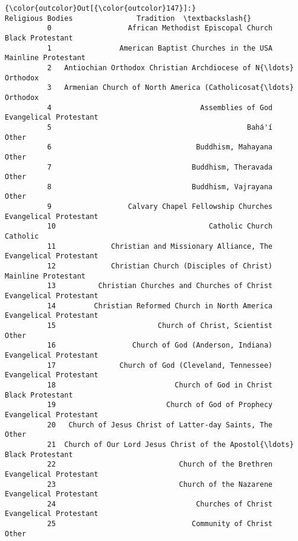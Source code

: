 \documentclass[11pt]{article}
\begin{document}
\begin{Verbatim}[commandchars=\\\{\}]
{\color{outcolor}Out[{\color{outcolor}147}]:}                                      Religious Bodies               Tradition  \textbackslash{}
          0                  African Methodist Episcopal Church        Black Protestant   
          1                American Baptist Churches in the USA     Mainline Protestant   
          2   Antiochian Orthodox Christian Archdiocese of N{\ldots}                Orthodox   
          3   Armenian Church of North America (Catholicosat{\ldots}                Orthodox   
          4                                   Assemblies of God  Evangelical Protestant   
          5                                              Bahá'í                   Other   
          6                                  Buddhism, Mahayana                   Other   
          7                                 Buddhism, Theravada                   Other   
          8                                 Buddhism, Vajrayana                   Other   
          9                  Calvary Chapel Fellowship Churches  Evangelical Protestant   
          10                                    Catholic Church                Catholic   
          11             Christian and Missionary Alliance, The  Evangelical Protestant   
          12             Christian Church (Disciples of Christ)     Mainline Protestant   
          13          Christian Churches and Churches of Christ  Evangelical Protestant   
          14         Christian Reformed Church in North America  Evangelical Protestant   
          15                        Church of Christ, Scientist                   Other   
          16                  Church of God (Anderson, Indiana)  Evangelical Protestant   
          17               Church of God (Cleveland, Tennessee)  Evangelical Protestant   
          18                            Church of God in Christ        Black Protestant   
          19                          Church of God of Prophecy  Evangelical Protestant   
          20   Church of Jesus Christ of Latter-day Saints, The                   Other   
          21  Church of Our Lord Jesus Christ of the Apostol{\ldots}        Black Protestant   
          22                             Church of the Brethren  Evangelical Protestant   
          23                             Church of the Nazarene  Evangelical Protestant   
          24                                 Churches of Christ  Evangelical Protestant   
          25                                Community of Christ                   Other   

\end{Verbatim}
\end{document}
